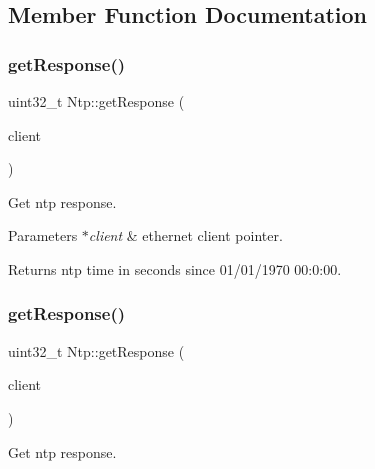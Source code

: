 \subsection{Member Function Documentation}
\mbox{\label{classNtp_a6df9e799d7fb829ff163ea14a70f6999}} 
\subsubsection{\texorpdfstring{get\+Response()}{getResponse()}\hspace{0.1cm}{\footnotesize\ttfamily [1/2]}}
{\footnotesize\ttfamily uint32\+\_\+t Ntp\+::get\+Response (\begin{DoxyParamCaption}\item[{Ethernet\+U\+DP $\ast$}]{client }\end{DoxyParamCaption})\hspace{0.3cm}{\ttfamily [static]}}



Get ntp response. 


\begin{DoxyParams}{Parameters}
{\em $\ast$client} & ethernet client pointer. \\
\hline
\end{DoxyParams}
\begin{DoxyReturn}{Returns}
ntp time in seconds since 01/01/1970 00\+:0\+:00. 
\end{DoxyReturn}
\mbox{\label{classNtp_a6456f082f6b3012f72c5064e45791ddd}} 
\subsubsection{\texorpdfstring{get\+Response()}{getResponse()}\hspace{0.1cm}{\footnotesize\ttfamily [2/2]}}
{\footnotesize\ttfamily uint32\+\_\+t Ntp\+::get\+Response (\begin{DoxyParamCaption}\item[{sim800\+Client $\ast$}]{client }\end{DoxyParamCaption})\hspace{0.3cm}{\ttfamily [static]}}



Get ntp response. 


